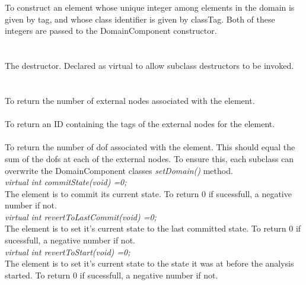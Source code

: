   \\
  \\
To construct an element whose unique integer among elements in the
domain is given by \p tag, and whose class identifier is given
by \p classTag. Both of these integers are passed to the
DomainComponent constructor. \\

 \\
\\ 
The destructor. Declared as virtual to allow subclass destructors to
be invoked. \\

  \\
 \\
To return the number of external nodes associated with the element. \\

 \\
To return an ID containing the tags of the external nodes for the element. \\

\\
To return the number of dof associated with the element. This should
equal the sum of the dofs at each of the external nodes. To ensure
this, each subclass can overwrite the DomainComponent classes {\em
setDomain()} method.\\ 

{\em virtual int commitState(void) =0;} \\
The element is to commit its current state. To return $0$ if
sucessfull, a negative number if not. \\

{\em virtual int revertToLastCommit(void) =0;} \\
The element is to set it's current state to the last committed
state. To return $0$ if sucessfull, a negative number if not. \\

{\em virtual int revertToStart(void) =0;} \\
The element is to set it's current state to the state it was at before
the analysis started. To return $0$ if sucessfull, a negative number
if not. \\ 

